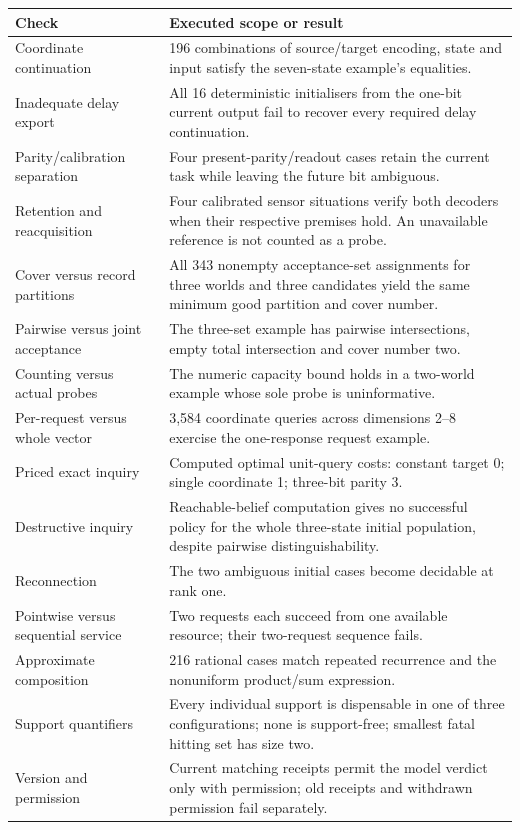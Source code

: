 \begin{longtable}{@{}p{.41\linewidth}p{.51\linewidth}@{}}
\toprule
Check & Executed scope or result\\
\midrule
\endhead
Coordinate continuation & 196 combinations of source/target encoding, state and input satisfy the seven-state example's equalities.\\
Inadequate delay export & All 16 deterministic initialisers from the one-bit current output fail to recover every required delay continuation.\\
Parity/calibration separation & Four present-parity/readout cases retain the current task while leaving the future bit ambiguous.\\
Retention and reacquisition & Four calibrated sensor situations verify both decoders when their respective premises hold. An unavailable reference is not counted as a probe.\\
Cover versus record partitions & All 343 nonempty acceptance-set assignments for three worlds and three candidates yield the same minimum good partition and cover number.\\
Pairwise versus joint acceptance & The three-set example has pairwise intersections, empty total intersection and cover number two.\\
Counting versus actual probes & The numeric capacity bound holds in a two-world example whose sole probe is uninformative.\\
Per-request versus whole vector & 3,584 coordinate queries across dimensions 2--8 exercise the one-response request example.\\
Priced exact inquiry & Computed optimal unit-query costs: constant target 0; single coordinate 1; three-bit parity 3.\\
Destructive inquiry & Reachable-belief computation gives no successful policy for the whole three-state initial population, despite pairwise distinguishability.\\
Reconnection & The two ambiguous initial cases become decidable at rank one.\\
Pointwise versus sequential service & Two requests each succeed from one available resource; their two-request sequence fails.\\
Approximate composition & 216 rational cases match repeated recurrence and the nonuniform product/sum expression.\\
Support quantifiers & Every individual support is dispensable in one of three configurations; none is support-free; smallest fatal hitting set has size two.\\
Version and permission & Current matching receipts permit the model verdict only with permission; old receipts and withdrawn permission fail separately.\\
\bottomrule
\end{longtable}

